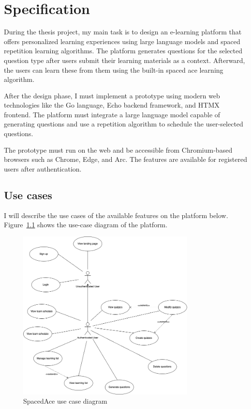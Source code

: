 \chapter{Specification}\label{ch:specification}

During the thesis project, my main task is to design an e-learning platform that offers personalized learning experiences using large language models and spaced repetition learning algorithms. The platform generates questions for the selected question type after users submit their learning materials as a context. Afterward, the users can learn these from them using the built-in spaced ace learning algorithm.

After the design phase, I must implement a prototype using modern web technologies like the Go language, Echo backend framework, and HTMX frontend. The platform must integrate a large language model capable of generating questions and use a repetition algorithm to schedule the user-selected questions.

The prototype must run on the web and be accessible from Chromium-based browsers such as Chrome, Edge, and Arc. The features are available for registered users after authentication.

\section{Use cases}

I will describe the use cases of the available features on the platform below. Figure~\ref{fig:use-case} shows the use-case diagram of the platform.

\begin{figure}[H]
    \centering
    \includegraphics[width=0.8\textwidth, keepaspectratio]{figures/use-case.png}
    \caption{SpacedAce use case diagram}
    \label{fig:use-case}
\end{figure}

